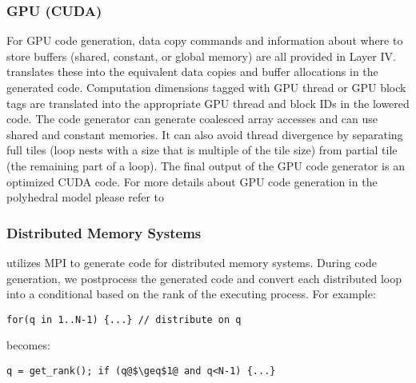 \subsubsection{GPU (CUDA)}
For GPU code generation, data copy commands and information about where to store buffers (shared, constant, or global memory) are all provided in Layer IV.  \framework{} translates these into the equivalent data copies and buffer allocations in the generated code.  Computation dimensions tagged with GPU thread or GPU block tags are translated into the appropriate GPU thread and block IDs in the lowered code.  The \framework{} code generator can generate coalesced array accesses and can use shared and constant memories. It can also avoid thread divergence by separating full tiles (loop nests with a size that is multiple of the tile size) from partial tile (the remaining part of a loop).
The final output of the GPU code generator is an optimized CUDA code. For more details about GPU code generation in the polyhedral model please refer to~\cite{pencil_pact,Verdoolaege2013PPCG}


\subsubsection{Distributed Memory Systems}

\framework{} utilizes MPI to generate code for distributed memory systems.  During code generation, we postprocess the generated code and convert each distributed loop into a conditional based on the rank of the executing process. For example:
\vspace{-0.15cm}
\begin{lstlisting}[numbers=none]
for(q in 1..N-1) {...} // distribute on q
\end{lstlisting}
\vspace{-0.15cm}
becomes:
\vspace{-0.15cm}
\begin{lstlisting}[escapechar=@,numbers=none]
q = get_rank(); if (q@$\geq$1@ and q<N-1) {...}
\end{lstlisting}



